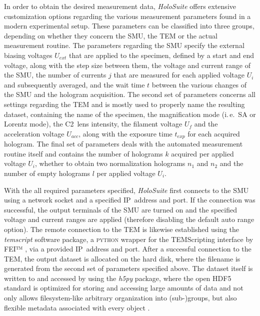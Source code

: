 In order to obtain the desired measurement data, \emph{HoloSuite} offers extensive customization options regarding the various measurement parameters found in a modern experimental setup. These parameters can be classified into three groups, depending on whether they concern the SMU, the TEM or the actual measurement routine. The parameters regarding the SMU specify the external biasing voltages $U_{\mathit{ext}}$ that are applied to the specimen, defined by a start and end voltage, along with the step size between them, the voltage and current range of the SMU, the number of currents $j$ that are measured for each applied voltage $U_i$ and subsequently averaged, and the wait time $t$ between the various changes of the SMU and the hologram acquisition. The second set of parameters concerns all settings regarding the TEM and is mostly used to properly name the resulting dataset, containing the name of the specimen, the magnification mode (i.\,e.\ SA or Lorentz mode), the C2~lens intensity, the filament voltage $U_f$ and the acceleration voltage $U_{\mathit{acc}}$, along with the exposure time $t_{\mathit{exp}}$ for each acquired hologram. The final set of parameters deals with the automated measurement routine itself and contains the number of holograms $k$ acquired per applied voltage $U_i$, whether to obtain two normalization holograms $n_1$ and $n_2$ and the number of empty holograms $l$ per applied voltage $U_i$.

With the all required parameters specified, \emph{HoloSuite} first connects to the SMU using a network socket and a specified IP~address and port. If the connection was successful, the output terminals of the SMU are turned on and the specified voltage and current ranges are applied (therefore disabling the default auto range option). The remote connection to the TEM is likewise established using the \emph{temscript} software package, a \textsc{python} wrapper for the TEMScripting interface by FEI™ \cite{temscript}, via a provided IP~address and port. After a successful connection to the TEM, the output dataset is allocated on the hard disk, where the filename is generated from the second set of parameters specified above. The dataset itself is written to and accessed by using the \emph{h5py} package, where the open HDF5 standard is optimized for storing and accessing large amounts of data and not only allows filesystem-like arbitrary organization into (sub-)groups, but also flexible metadata associated with every object \cite{Collette2014}.


